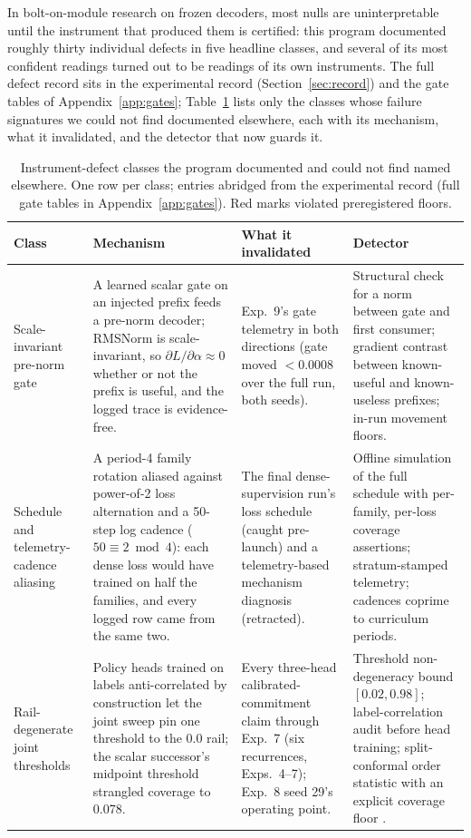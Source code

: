 \documentclass[10pt,a4paper]{article}
\newcommand{\fail}[1]{\textcolor{failred}{#1}}
\begin{document}
In bolt-on-module research on frozen decoders, most nulls are uninterpretable until the instrument that produced them is certified: this program documented roughly thirty individual defects in five headline classes, and several of its most confident readings turned out to be readings of its own instruments. The full defect record sits in the experimental record (Section~\ref{sec:record}) and the gate tables of Appendix~\ref{app:gates}; Table~\ref{tab:taxonomy} lists only the classes whose failure signatures we could not find documented elsewhere, each with its mechanism, what it invalidated, and the detector that now guards it.

\begin{table}[htbp]
\caption{Instrument-defect classes the program documented and could not find named elsewhere. One row per class; entries abridged from the experimental record (full gate tables in Appendix~\ref{app:gates}). \fail{Red} marks violated preregistered floors.}
\label{tab:taxonomy}
\centering\footnotesize
\begin{tabularx}{\textwidth}{@{}>{\raggedright\arraybackslash}p{1.7cm}>{\raggedright\arraybackslash}X>{\raggedright\arraybackslash}X>{\raggedright\arraybackslash}X@{}}
\toprule
Class & Mechanism & What it invalidated & Detector \\
\midrule
Scale-invariant pre-norm gate & A learned scalar gate on an injected prefix feeds a pre-norm decoder; RMSNorm is scale-invariant, so $\partial L/\partial\alpha\approx 0$ whether or not the prefix is useful, and the logged trace is evidence-free. & Exp.~9's gate telemetry in both directions (gate moved $<0.0008$ over the full run, both seeds). & Structural check for a norm between gate and first consumer; gradient contrast between known-useful and known-useless prefixes; in-run movement floors. \\
\addlinespace
Schedule and telemetry-cadence aliasing & A period-4 family rotation aliased against power-of-2 loss alternation and a 50-step log cadence ($50\equiv 2 \bmod 4$): each dense loss would have trained on half the families, and every logged row came from the same two. & The final dense-supervision run's loss schedule (caught pre-launch) and a telemetry-based mechanism diagnosis (retracted). & Offline simulation of the full schedule with per-family, per-loss coverage assertions; stratum-stamped telemetry; cadences coprime to curriculum periods. \\
\addlinespace
Rail-degenerate joint thresholds & Policy heads trained on labels anti-correlated by construction let the joint sweep pin one threshold to the 0.0 rail; the scalar successor's midpoint threshold strangled coverage to \fail{0.078}. & Every three-head calibrated-commitment claim through Exp.~7 (six recurrences, Exps.~4--7); Exp.~8 seed 29's operating point. & Threshold non-degeneracy bound $[0.02,0.98]$; label-correlation audit before head training; split-conformal order statistic with an explicit coverage floor \cite{vovk2005,angelopoulos2021}. \\

\end{tabularx}
\end{table}
\end{document}
